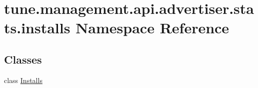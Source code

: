 \hypertarget{namespacetune_1_1management_1_1api_1_1advertiser_1_1stats_1_1installs}{\section{tune.\-management.\-api.\-advertiser.\-stats.\-installs Namespace Reference}
\label{namespacetune_1_1management_1_1api_1_1advertiser_1_1stats_1_1installs}
}
\subsection*{Classes}
\begin{DoxyCompactItemize}
\item 
class \hyperlink{classtune_1_1management_1_1api_1_1advertiser_1_1stats_1_1installs_1_1Installs}{Installs}
\end{DoxyCompactItemize}
